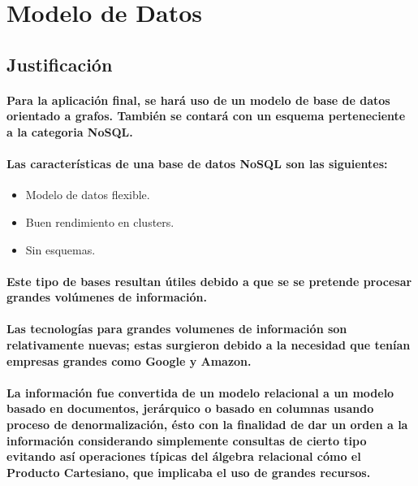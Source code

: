 \clearpage
\section{Modelo de Datos}

\subsection{Justificación}
\paragraph{Para la aplicación final, se hará uso de un modelo de base de datos orientado a grafos. También se contará con un esquema perteneciente a la categoria NoSQL.}
\paragraph{ Las características de una base de datos NoSQL son las siguientes: }

\begin{itemize}
  \item Modelo de datos flexible.
  \item Buen rendimiento en clusters.
  \item Sin esquemas.
\end{itemize}

\paragraph{Este tipo de bases resultan útiles debido a que se se pretende procesar grandes volúmenes de información.}

\paragraph{Las tecnologías para grandes volumenes de información son relativamente nuevas; estas surgieron debido a la necesidad que tenían empresas grandes como Google y Amazon.}

\paragraph{La información fue convertida de un modelo relacional a un modelo basado en documentos, jerárquico o basado en columnas usando proceso de denormalización, ésto con la finalidad de dar un orden a la información considerando simplemente consultas de cierto tipo evitando así operaciones típicas del álgebra relacional cómo el Producto Cartesiano, que implicaba el uso de grandes recursos.}

